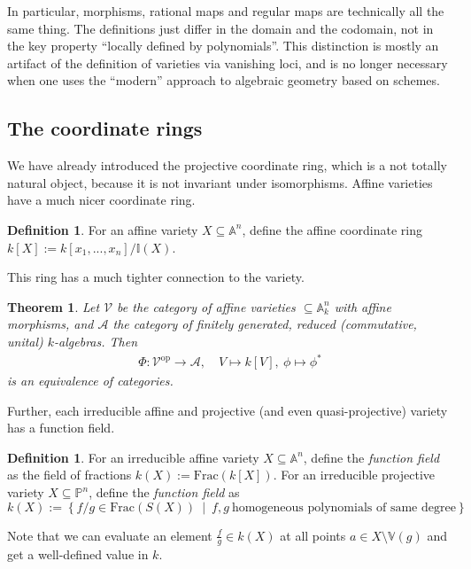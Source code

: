 \documentclass{scrartcl}
\newcommand{\I}{\mathbb{I}}
\newcommand{\V}{\mathbb{V}}
\newcommand{\Aff}{\mathbb{A}}
\newcommand{\Proj}{\mathbb{P}}
\newtheorem{theorem}[prop]{Theorem}
\theoremstyle{definition}
\newtheorem{definition}[prop]{Definition}
\begin{document}
In particular, morphisms, rational maps and regular maps are technically all the same thing.
The definitions just differ in the domain and the codomain, not in the key property ``locally defined by polynomials''.
This distinction is mostly an artifact of the definition of varieties via vanishing loci, and is no longer necessary when one uses the ``modern'' approach to algebraic geometry based on schemes.

\subsection{The coordinate rings}
We have already introduced the projective coordinate ring, which is a not totally natural object, because it is not invariant under isomorphisms.
Affine varieties have a much nicer coordinate ring.
\begin{definition}
    For an affine variety $X \subseteq \Aff^n$, define the affine coordinate ring $k[X] := k[x_1, ..., x_n] / \I(X)$.
\end{definition}
This ring has a much tighter connection to the variety.
\begin{theorem}
    \label{prop:equivalence_of_categories}
    Let $\mathcal{V}$ be the category of affine varieties $\subseteq \Aff_k^n$ with affine morphisms, and $\mathcal{A}$ the category of finitely generated, reduced (commutative, unital) $k$-algebras.
    Then
    \begin{align*}
        \Phi: \mathcal{V}^{\mathrm{op}} \to \mathcal{A}, \quad V \mapsto k[V], \ \phi \mapsto \phi^*
    \end{align*}
    is an equivalence of categories.
\end{theorem}
Further, each irreducible affine and projective (and even quasi-projective) variety has a function field.
\begin{definition}
    For an irreducible affine variety $X \subseteq \Aff^n$, define the \emph{function field} as the field of fractions $k(X) := \mathrm{Frac}(k[X])$.
    For an irreducible projective variety $X \subseteq \Proj^n$, define the \emph{function field} as
    \begin{equation*}
        k(X) := \left\{ f/g \in \mathrm{Frac}(S(X)) \ \middle| \ f, g \ \text{homogeneous polynomials of same degree} \right\}
    \end{equation*}
\end{definition}
Note that we can evaluate an element $\frac f g \in k(X)$ at all points $a \in X \setminus \V(g)$ and get a well-defined value in $k$.
\end{document}
